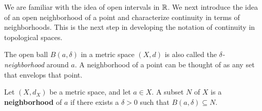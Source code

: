 \begin{comment}

\item  Let $a = (3,2)$. If $x \neq a$ in this space, then $d(x,a) = 1$. So the only element in $B((3,2),1)$ in this space is $a$ itself, as shown at right in Figure \ref{F:Balls_4_5}. However, if $r > 1$, then every element in $\R^2$ is in $B(a,r)$. 

\ee

\end{comment}



We are familiar with the idea of open intervals in $\mathbb{R}$. We next introduce the idea of an open neighborhood of a point and characterize continuity in terms of neighborhoods. This is the next step in developing the notation of continuity in topological spaces. 

The open ball $B(a, \delta)$ in a metric space $(X,d)$ is also called the \emph{$\delta$-neighborhood} around $a$. A neighborhood of a point can be thought of as any set that envelops that point. 

\begin{definition} Let $(X, d_X)$ be a metric space, and let $a \in X$. A subset $N$ of $X$ is a \textbf{neighborhood} of $a$ if there exists a $\delta > 0$ such that $B(a, \delta) \subseteq N$. 
\end{definition} 

